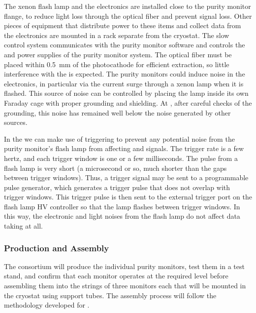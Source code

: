The xenon flash lamp and the  electronics are installed close to the purity monitor flange, to reduce light loss through the optical fiber and prevent signal loss. Other pieces of equipment that distribute power to these items and collect data from the electronics are mounted in a rack separate from the cryostat. The slow control system communicates with the purity monitor  software and controls  the  and  power supplies of the purity monitor system. The optical fiber must be placed within  \SI{0.5}{\milli\meter} of the photocathode for efficient \phel extraction, so little interference with the  is expected. The purity monitors could induce noise in the  electronics, in particular via the current surge through a xenon lamp when it is flashed.  This source of noise can be controlled by placing the lamp inside its own Faraday cage with %
proper grounding and shielding. %
At , after careful checks of the grounding, this noise has remained well below the noise generated by other sources.

In the  we can make use of triggering to prevent any potential noise from the purity monitor's flash lamp from affecting  and  signals. The  trigger rate is a few hertz, and each trigger window is one or a few milliseconds. %
The pulse from a flash lamp is very short (a microsecond or so, much shorter than the gaps between  trigger windows). 
Thus, a  trigger signal may be sent to a programmable pulse generator, %
which generates a trigger pulse that does not overlap with  trigger windows. This trigger pulse %
is then sent to the external trigger port on the flash lamp HV controller so that the lamp flashes between  trigger windows. In this way, the electronic and light noises from the flash lamp do %
not affect %
data taking at all.



\subsubsection{Production and Assembly}
\label{sec:PrMon-Production-Assembly}

The  consortium will produce the individual purity monitors, test them in a test stand, and confirm that each monitor operates at the required level before assembling them into the strings of three monitors each that will be mounted in the  cryostat using support tubes. The assembly process will follow the methodology developed for .




